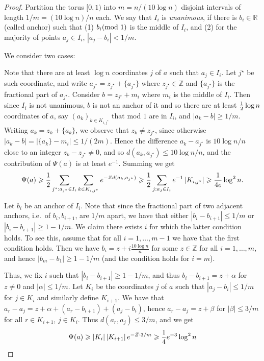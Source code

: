 \documentclass[10pt,a4paper]{article}
\newcommand\card[1]{\left| {#1} \right|}
\newcommand\half{{1\over2}}
\renewcommand\geq{\geqslant}
\renewcommand\leq{\leqslant}
\newcommand{\RR}{\mathbb{R}}
\begin{document}
\begin{proof}
 Partition the torus $[0,1)$ into $m = n/(10 \log n)$ disjoint intervals of length $1/m = (10 \log n)/n$ each.
 We say that $I_i$ is {\em unanimous}, if there is $b_i\in \RR$ (called anchor) such that
 (1) $b_i\hspace{-1ex}\pmod{1}$ is the middle of $I_i$, and (2) for the majority of points $a_j\in I_i$, $|a_j-b_i|< 1/m$.

 We consider two cases:

 Note that there are at least $\log n$ coordinates $j$ of $a$ such that $a_j\in I_i$.
Let $j^{\star}$ be such coordinate, and write $a_{j^{\star}} = z_{j^{\star}} + \{a_{j^{\star}}\}$ where $z_{j^{\star}}\in\mathbb{Z}$ and
$\{a_{j^{\star}}\}$ is the fractional part of $a_{j^{\star}}$. Consider
$b = z_{j^{\star}} + m_i$ where $m_i$ is the middle of $I_i$. Then since $I_i$ is not unanimous, $b$ is not an anchor of it and so there are at least $\half \log n$
coordinates of $a$, say $(a_k)_{k\in K_{i,j^{\star}}}$ that mod $1$ are in $I_i$, and $\card{a_k - b}\geq 1/m$. Writing $a_k = z_k + \{a_k\}$, we observe that $z_k\neq z_{j^{\star}}$,
since otherwise $\card{a_k - b}= \card{\{a_k\} - m_i} \leq 1/(2m)$. Hence the difference $a_k-a_{j^{\star}}$
is $10\log n/n$ close to an integer $z_k-z_{j^{\star}}\neq 0$, and so $d(a_k,a_{j^{\star}})\leq 10\log n/n$, and the contribution of $\Psi(a)$ is
at least $e^{-1}$. Summing we get
\[
\Psi(a)\geq
\half
\sum\limits_{j^{\star}: a_{j^{\star}} \in I_i}
\sum\limits_{k\in K_{i,j^{\star}}}{e^{-Z d(a_k,a_{j^{\star}})}}
\geq
\half
\sum\limits_{j: a_j \in I_i}
e^{-1} \card{K_{i,j^{\star}}}
\geq \frac{1}{4e} \log^2 n.
\]

 Let $b_i$ be an anchor of $I_i$. Note that since the fractional part of two adjacent anchors,
i.e.\ of $b_i,b_{i+1}$, are $1/m$ apart, we have that either $\card{b_i - b_{i+1}}\leq 1/m$ or $\card{b_i-b_{i+1}}\geq 1-1/m$. We claim there exists $i$ for
which the latter condition holds. To see this, assume that for all $i=1,\ldots,m-1$ we have that the first condition holds. Then we have
$b_i = z + i \frac{10\log n}{n}$ for some $z\in \mathbb{Z}$ for all $i=1,\ldots,m$, and hence $\card{b_m - b_1}\geq 1-1/m$ (and the condition holds for $i=m$).

Thus, we fix $i$ such that $\card{b_i-b_{i+1}}\geq 1-1/m$, and thus $b_i - b_{i+1} = z + \alpha$ for $z\neq 0$ and $\card{\alpha}\leq 1/m$.
Let $K_i$ be the coordinates $j$ of $a$ such that $\card{a_j - b_i}\leq 1/m$ for $j\in K_i$
and similarly define $K_{i+1}$.
We have that $a_r - a_j = z + \alpha + (a_r - b_{i+1}) + (a_j - b_i)$, hence $a_r - a_j = z + \beta$ for $\card{\beta}\leq 3/m$ for all $r\in K_{i+1}$, $j\in K_i$.
Thus $d(a_r,a_j)\leq 3/m$, and we get
\[
\Psi(a)\geq \card{K_i}\card{K_{i+1}} e^{-Z\cdot 3/m}\geq \frac{1}{4} e^{-3} \log^2 n\qedhere
\]
\end{proof}
\end{document}
